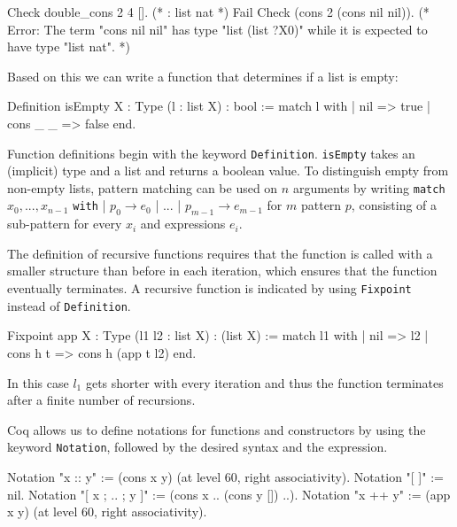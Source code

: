 \documentclass[fleqn, abstract=on]{scrreprt}
\newcommand{\coqinline}[1]{\texttt{#1}}
\begin{document}
\begin{coqcode}
Check double_cons 2 4 []. (* : list nat *)
Fail Check (cons 2 (cons nil nil)). 
(* Error: The term "cons nil nil" has type "list (list ?X0)"
while it is expected to have type "list nat". *)
\end{coqcode}
Based on this we can write a function that determines if a list is empty:
\begin{coqcode}
Definition isEmpty {X : Type} (l : list X) : bool := 
  match l with
  | nil      => true
  | cons _ _ => false
  end.
\end{coqcode}
Function definitions begin with the keyword \coqinline{Definition}. \coqinline{isEmpty} takes an (implicit) type and a list and returns a boolean value.
To distinguish empty from non-empty lists, pattern matching can be used on $n$ arguments by writing \coqinline{match} $x_{0},...,x_{n-1}$ \coqinline{with} | $p_{0} \rightarrow e_{0}$ | ... | $p_{m-1} \rightarrow e_{m-1}$ for $m$ pattern $p$, consisting of a sub-pattern for every $x_{i}$ and expressions $e_{i}$.

The definition of recursive functions requires that the function is called with a smaller structure than before in each iteration, which ensures that the function eventually terminates. A recursive function is indicated by using \coqinline{Fixpoint} instead of \coqinline{Definition}.
\begin{coqcode}
Fixpoint app {X : Type} (l1 l2 : list X) : (list X) :=
  match l1 with
  | nil => l2
  | cons h t => cons h (app t l2)
  end.
\end{coqcode}
In this case $l_{1}$ gets shorter with every iteration and thus the function terminates after a finite number of recursions. 

Coq allows us to define notations for functions and constructors by using the keyword \coqinline{Notation}, followed by the desired syntax and the expression. 
\begin{coqcode}
Notation "x :: y" := (cons x y) (at level 60, right associativity).
Notation "[ ]" := nil.
Notation "[ x ; .. ; y ]" := (cons x .. (cons y []) ..).
Notation "x ++ y" := (app x y) (at level 60, right associativity).
\end{coqcode}
\end{document}
